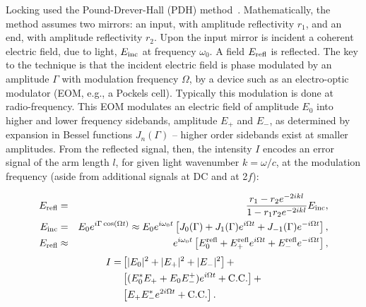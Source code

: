 Locking used the Pound-Drever-Hall (PDH) method~\cite{PDHNotes,MavalvalaThesis}.
Mathematically, the method assumes two mirrors: an input, with amplitude reflectivity $r_1$, and an end, with amplitude reflectivity $r_2$.
Upon the input mirror is incident a coherent electric field, due to light, $E_\textup{inc}$ at frequency $\omega_0$. A field $E_{\textup{refl}}$ is reflected.
The key to the technique is that the incident electric field is phase modulated by an amplitude $\Gamma$ with modulation frequency $\Omega$, by a device such as an electro-optic modulator (EOM, e.g., a Pockels cell).
Typically this modulation is done at radio-frequency.
This EOM modulates an electric field of amplitude $E_0$ into higher and lower frequency sidebands, amplitude $E_+$ and $E_-$, as determined by expansion in Bessel functions $J_n(\Gamma)$ -- higher order sidebands exist at smaller amplitudes.
From the reflected signal, then, the intensity $I$ encodes an error signal of the arm length $l$, for given light wavenumber $k = \omega / c$, at the modulation frequency (aside from additional signals at DC and at 2$f$):

\begin{eqnarray}
E_{\textup{refl}} &=& \frac{r_1 - r_2 e^{-2 i k l}}{1 - r_1 r_2 e^{-2 i k l}} E_\textup{inc},\\
E_\textup{inc} &=& E_0 e^{i \Gamma \cos \left( \Omega t \right)} \approx E_0 e^{i \omega_0 t} \left[ J_0 (\Gamma) + J_1 (\Gamma) e^{i\Omega t} + J_{-1} (\Gamma) e^{-i \Omega t} \right],\\
E_\textup{refl} &\approx& e^{i \omega_0 t} \left[ E_0^\textup{refl} + E_+^\textup{refl} e^{i\Omega t} + E_-^\textup{refl} e^{-i \Omega t}\right],
\end{eqnarray}
\begin{equation}
\begin{split}
I =& \left[ |E_0|^2 + |E_+|^2 + |E_-|^2\right] + \\ 
  & \left[(E_0^* E_+ + E_0 E^+_-)e^{i\Omega t} +\textup{C.C.} \right] + \\
  &\left[E_+ E_-^* e^{2i\Omega t} +\textup{C.C.} \right].
\end{split}
\end{equation}

